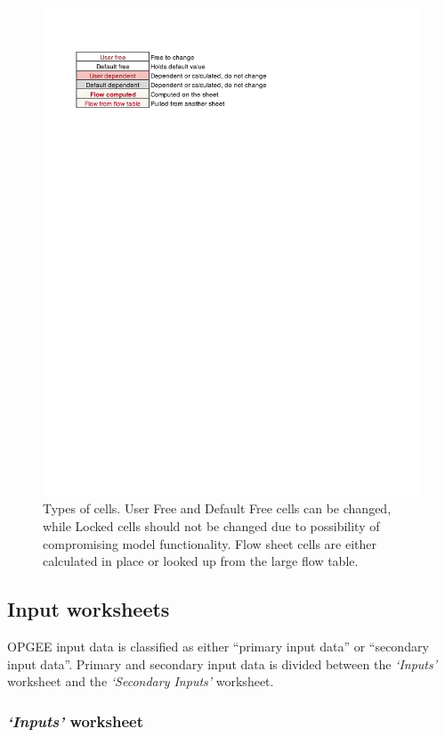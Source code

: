 \documentclass[11pt]{report}
\newcommand{\sheet}[1]{\textit{`{#1}'}}
\begin{document}
\begin{figure}[h]
\includegraphics[width=1\columnwidth]{documentation/images/CellTypes.pdf}
\caption{Types of cells. User Free and Default Free cells can be changed, while Locked cells should not be changed due to possibility of compromising model functionality. Flow sheet cells are either calculated in place or looked up from the large flow table.}
\label{fig:cell_types}
\end{figure}

\subsection{Input worksheets} 

OPGEE input data is classified as either ``primary input data'' or ``secondary input data''. Primary and secondary input data is divided between the \sheet{Inputs} worksheet and the \sheet{Secondary Inputs} worksheet.

\subsubsection{\sheet{Inputs} worksheet}
\end{document}
